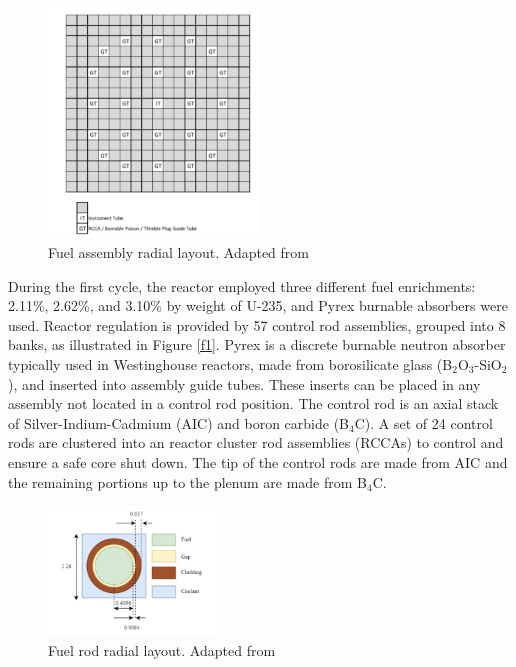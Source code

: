 \begin{figure}
    \centering
    \includegraphics[width=0.5\textwidth]{figs/asm.png}
    \caption[Fuel assembly radial layout.]{Fuel assembly radial layout. Adapted from \cite{albagami}}
    \label{f3}
\end{figure}

During the first cycle, the reactor employed three different fuel enrichments: 2.11\%, 2.62\%, and 3.10\% by weight of U-235, and Pyrex burnable absorbers were used. Reactor regulation is provided by 57 control rod assemblies, grouped into 8 banks, as illustrated in Figure \ref{f1}. Pyrex is a discrete burnable neutron absorber typically used in Westinghouse reactors, made from borosilicate glass (B$_2$O$_3$-SiO$_2$), and inserted into assembly guide tubes. These inserts can be placed in any assembly not located in a control rod position. The control rod is an axial stack of Silver-Indium-Cadmium (AIC) and boron carbide (B$_4$C). A set of 24 control rods are clustered into an reactor cluster rod assemblies (RCCAs) to control and ensure a safe core shut down. The tip of the control rods are made from AIC and the remaining portions up to the plenum are made from B$_4$C. 

\begin{figure}
    \centering
    \includegraphics[width=0.4\textwidth]{figs/pin.png}
    \caption[Fuel rod radial layout.]{Fuel rod radial layout. Adapted from \cite{albagami}}
    \label{f2}
\end{figure}

